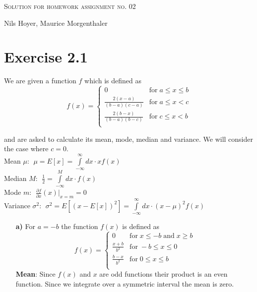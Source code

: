 \documentclass[10pt]{article}
\newenvironment{myfont}{\fontfamily{put}\selectfont}{\par}
\begin{document}
\begin{myfont}



\begin{center}
	\begin{Large}
		\textsc{Solution for homework assignment no. 02} \\
	\end{Large}
	\vspace*{0.4cm}
		Nils Hoyer, Maurice Morgenthaler
		\vspace*{1cm}
\end{center}

\section*{Exercise 2.1}

We are given a function $f$ which is defined as
\begin{equation}
f(x) =
\begin{cases}
0                           & \textrm{for}\; a \leq x \leq b \\
\frac{2(x-a)}{(b-a)(c-a)}   & \textrm{for}\; a \leq x < c \\
\frac{2(b-x)}{(b-a)(b-c)}   & \textrm{for}\; c \leq x < b \\
\end{cases}
\end{equation}

\noindent and are asked to calculate its mean, mode, median and variance.
We will consider the case where $c = 0$. \\

\noindent Mean $\mu$: $\;\mu = E[x] = \int\limits_{-\infty}^{\infty}dx \cdot xf(x)$ \\
\noindent Median $M$: $\;\frac{1}{2} = \int\limits_{-\infty}^{M}dx \cdot f(x)$ \\
\noindent Mode $m$: $\;\frac{\partial f}{\partial x}(x)|_{x = m} = 0$ \\
\noindent Variance $\sigma^{2}$: $\;\sigma^{2} = E[(x - E[x])^{2}] = \int\limits_{-\infty}^{\infty}dx \cdot (x - \mu)^{2}f(x)$

\begin{itemize}
  \item[\textbf{a)}] For $a = -b$ the function $f(x)$ is defined as
  $$
  f(x) = 
  \begin{cases}
  0                         & \textrm{for}\; x \leq -b \; \textrm{and}\; x \geq b \\
  \frac{x+b}{b^{2}}         & \textrm{for}\; -b \leq x \leq 0 \\
  \frac{b-x}{b^{2}}         & \textrm{for}\; 0 \leq x \leq b \\
  \end{cases}
  $$
  \noindent \textbf{Mean}: Since $f(x)$ and $x$ are odd functions their product is an even function. 
  Since we integrate over a symmetric interval the mean is zero. \\


\end{itemize}
\end{myfont}
\end{document}
